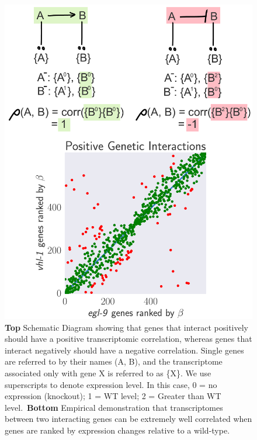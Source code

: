 \documentclass[9pt,twocolumn,twoside]{pnas-new}
\begin{document}
\begin{figure}%
\centering
\includegraphics[width=.8\linewidth]{figs/correlative_genetics.pdf}
\caption{\textbf{Top} Schematic Diagram showing that genes that interact positively should have a positive transcriptomic correlation, whereas genes that interact negatively should have a negative correlation. Single genes are referred to by their names (A, B), and the transcriptome associated only with gene X is referred to as \{X\}. We use superscripts to denote expression level. In this case, 0 = no expression (knockout); 1 = WT level; 2 = Greater than WT level.\ \textbf{Bottom} Empirical demonstration that transcriptomes between two interacting genes can be extremely well correlated when genes are ranked by expression changes relative to a wild-type.}
\label{fig:genetic_interactions}
\end{figure}
\end{document}
